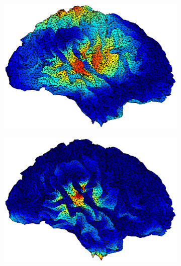\documentclass[doc,a4paper,12pt]{apa6}
\begin{document}
\begin{figure}
  \captionsetup{justification=centering}
  \begin{subfigure}[c]{0.47\textwidth}
    \includegraphics[width=\textwidth]{ergebnisse/activity/pa07_eve2_raw_lcmv_activity_right.eps}
    \label{img:pa07:aktiv:raw-lcmv}
  \end{subfigure}\hspace*{0.04\textwidth}
  \begin{subfigure}[c]{0.47\textwidth}
    \includegraphics[width=\textwidth]{ergebnisse/activity/pa07_eve2_raw_mne_activity_right.eps}
    \label{img:pa07:aktiv:raw-mne}
  \end{subfigure}\vspace*{0.04\textwidth}

\end{figure}
\end{document}
